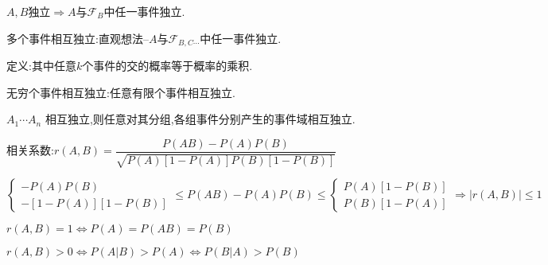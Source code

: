 $ A,B$独立$ \Rightarrow A与\mathcal{F}_B$中任一事件独立.

多个事件相互独立:直观想法--$ A与\mathcal{F}_{B,C\cdots}$中任一事件独立.

定义:其中任意$ k$个事件的交的概率等于概率的乘积.

无穷个事件相互独立:任意有限个事件相互独立.

$ A_1\cdots A_n$ 相互独立,则任意对其分组,各组事件分别产生的事件域相互独立.

相关系数:$ r(A,B)=\dfrac{P(AB)- P(A)P(B)}{\sqrt{P(A)[1-P(A)]P(B)[1-P(B)]}}$

$ \left \{\begin{matrix}-P(A)P(B)\\  -[1-P(A)][1-P(B)]\end{matrix} \right . \le P(AB)-P(A)P(B) \le \left \{ \begin{matrix} P(A)[1-P(B)]\\ P(B)[1-P(A)]\end{matrix}\right . 
			\Rightarrow  |r(A,B)| \le 1$ 

$ r(A,B)=1\Leftrightarrow P(A)=P(AB)=P(B)$

$ r(A,B)>0\Leftrightarrow P(A|B)>P(A)\Leftrightarrow P(B|A)>P(B)$
